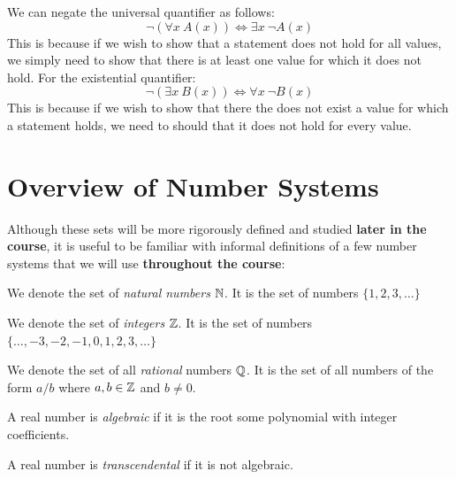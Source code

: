 \documentclass[../main.tex]{subfiles}
\begin{document}
We can negate the universal quantifier as follows:
\[
  \lnot (\forall x\ A(x)) \iff \exists x\ \lnot A(x)
\]
This is because if we wish to show that a statement does not hold for all values, we simply need to show that there is at least one value for which it does not hold.
For the existential quantifier:
\[
  \lnot (\exists x\ B(x)) \iff \forall x\ \lnot B(x)
\]
This is because if we wish to show that there the does not exist a value for which a statement holds, we need to should that it does not hold for every value.
\section{Overview of Number Systems}
\label{numberSystems}
Although these sets will be more rigorously defined and studied \textbf{later in the course}, it is useful to be familiar with informal definitions of a few number systems that we will use \textbf{throughout the course}:
\begin{definition}
  We denote the set of \textit{natural numbers} $\mathbb{N}$. It is the set of numbers $\{1, 2, 3, \ldots\}$
\end{definition}
\begin{definition}[Integers]
  We denote the set of \textit{integers} $\mathbb{Z}$. It is the set of numbers $\{\ldots, -3, -2, -1 , 0, 1, 2, 3, \ldots\}$
\end{definition}
\begin{definition}
  We denote the set of all \textit{rational} numbers $\mathbb{Q}$. It is the set of all numbers of the form $a/b$ where $a, b \in \mathbb{Z}$ and $b \neq 0$.
\end{definition}
\begin{definition}
  A real number is \textit{algebraic} if it is the root some polynomial with integer coefficients.
\end{definition}
\begin{definition}
  A real number is \textit{transcendental} if it is not algebraic.
\end{definition}
\end{document}
